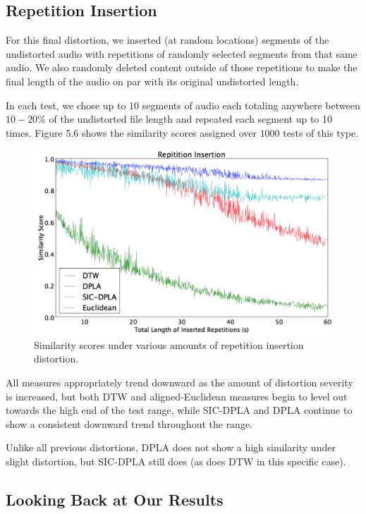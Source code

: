 \documentclass[12pt]{report} 	%
\numberwithin{figure}{chapter}
\numberwithin{table}{chapter}
\numberwithin{equation}{chapter}
\begin{document}
\begin{flushleft}
\subsection{Repetition Insertion}
For this final distortion, we inserted (at random locations) segments of the undistorted audio with repetitions of randomly selected segments from that same audio. We also randomly deleted content outside of those repetitions to make the final length of the audio on par with its original undistorted length.

In each test, we chose up to $10$ segments of audio each totaling anywhere between $10-20\%$ of the undistorted file length and repeated each segment up to 10 times. Figure 5.6 shows the similarity scores assigned over $1000$ tests of this type.
\begin{figure}[h!]
\begin{center}
\includegraphics[scale=0.5,width=\linewidth]{RepetitionInsertion}
\caption[Repetition insertion results]{Similarity scores under various amounts of repetition insertion distortion.}
\end{center}
\end{figure}

All measures appropriately trend downward as the amount of distortion severity is increased, but both DTW and aligned-Euclidean measures begin to level out towards the high end of the test range, while SIC-DPLA and DPLA continue to show a consistent downward trend throughout the range. 

Unlike all previous distortions, DPLA does not show a high similarity under slight distortion, but SIC-DPLA still does (as does DTW in this specific case).

\subsection{Looking Back at Our Results}


\end{flushleft}
\end{document}
